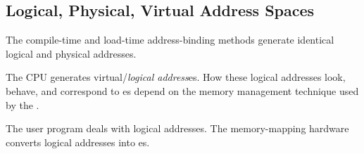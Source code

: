 \subsection{Logical, Physical, Virtual Address Spaces}\label{subsec:Logical_Physical_Virtual_Address_Space}
The compile-time and load-time address-binding methods generate identical logical and physical addresses.

\begin{definition}\label{def:Logical_Address}
  The CPU generates virtual/\emph{logical address}es.
  How these logical addresses look, behave, and correspond to es depend on the memory management technique used by the .

  The user program deals with logical addresses.
  The memory-mapping hardware converts logical addresses into es.
\end{definition}


